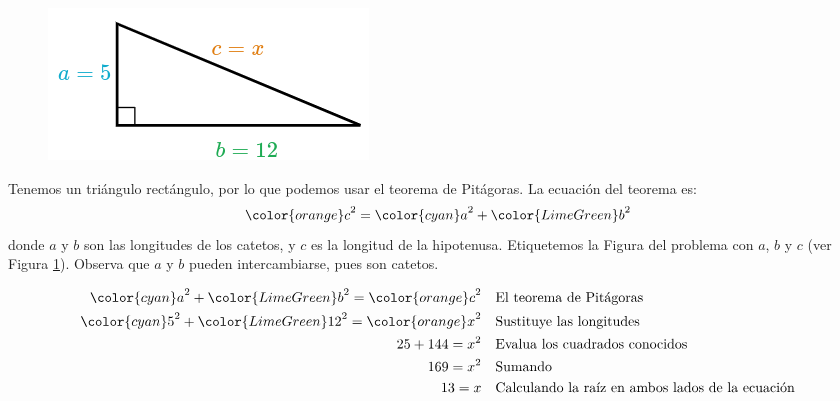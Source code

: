 \begin{minipage}[t][][t]{0.6\textwidth}
    \begin{solutionbox}{9cm}
        \begin{minipage}{0.4\textwidth}
            \begin{figure}[H]
                \centering
                \includegraphics[width=0.9\linewidth]{../images/lados_pitagoras_03a.png}
                \caption{}
                \label{fig:lados_pitagoras_03a}
            \end{figure}
        \end{minipage}\hfill
        \begin{minipage}{0.55\textwidth}
            Tenemos un triángulo rectángulo, por lo que podemos usar el teorema de Pitágoras.
            La ecuación del teorema es:
            \[{\color{orange}c}^2={\color{cyan}a}^2+{\color{LimeGreen}b}^2\]
            donde $a$ y $b$ son las longitudes de los catetos, y $c$ es la longitud de la hipotenusa.
            Etiquetemos la Figura del problema con $a$, $b$ y $c$ (ver Figura \ref{fig:lados_pitagoras_03a}).
            Observa que $a$ y $b$ pueden intercambiarse, pues son catetos.
        \end{minipage}
        \begin{align*}
            {\color{cyan}a}^2+{\color{LimeGreen}b}^2  ={\color{orange}c}^2  & \text{\quad El teorema de Pitágoras}                          \\
            {\color{cyan}5}^2+{\color{LimeGreen}12}^2  ={\color{orange}x}^2 & \text{\quad Sustituye las longitudes}                         \\
            25+144   =x^2                                                   & \text{\quad Evalua los cuadrados conocidos}                   \\
            169=x^2                                                         & \text{\quad Sumando }                                         \\
            13=x                                                            & \text{\quad Calculando la raíz en ambos lados de la ecuación} \\
        \end{align*}
    \end{solutionbox}
\end{minipage}
